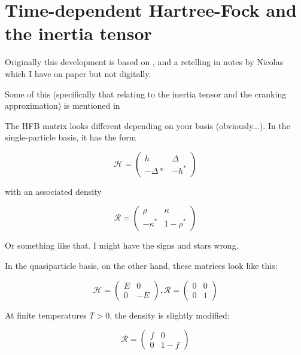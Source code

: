 \chapter{Time-dependent Hartree-Fock and the inertia tensor}

Originally this development is based on \cite{Engel1975}, and a retelling in notes by Nicolas which I have on paper but not digitally.


Some of this (specifically that relating to the inertia tensor and the cranking approximation) is mentioned in \cite{Baran2011}


The HFB matrix looks different depending on your basis (obviously...). In the single-particle basis, it has the form

\begin{equation}
\mathcal{H} = \left(\begin{array}{cc}
h & \Delta \\ 
-\Delta* & -h^*
\end{array} \right)
\end{equation}

\noindent with an associated density

\begin{equation}
\mathcal{R} = \left(\begin{array}{cc}
\rho & \kappa \\ 
-\kappa^* & 1-\rho^*
\end{array} \right)
\end{equation}

\noindent Or something like that. I might have the signs and stars wrong.

In the quasiparticle basis, on the other hand, these matrices look like this:

\begin{equation}
\mathcal{H} = \left(\begin{array}{cc}
E & 0 \\ 
0 & -E
\end{array} \right),      
\mathcal{R} = \left(\begin{array}{cc}
0 & 0 \\ 
0 & 1
\end{array} \right)
\end{equation}

\noindent At finite temperatures $T>0$, the density is slightly modified:

\begin{equation}
\mathcal{R} = \left(\begin{array}{cc}
f & 0 \\ 
0 & 1-f
\end{array} \right)
\end{equation}

